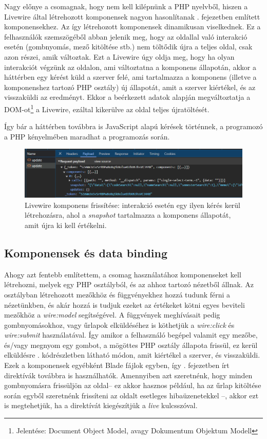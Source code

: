 \documentclass[
]{thesis-ekf}
\theoremstyle{definition}
\theoremstyle{remark}
\begin{document}
Nagy előnye a csomagnak, hogy nem kell kilépnünk a PHP nyelvből, hiszen a Livewire által létrehozott komponensek nagyon hasonlítanak . fejezetben említett komponensekhez. Az így létrehozott komponensek dinamikusan viselkednek. Ez a felhasználók szemszögéből abban jelenik meg, hogy az oldallal való interakció esetén (gombnyomás, mező kitöltése stb.) nem töltődik újra a teljes oldal, csak azon részei, amik változtak. Ezt a Livewire úgy oldja meg, hogy ha olyan interakciót végzünk az oldalon, ami változtatna a komponens állapotán, akkor a háttérben egy kérést küld a szerver felé, ami tartalmazza a komponens (illetve a komponenshez tartozó PHP osztály) új állapotát, amit a szerver kiértékel, és az visszaküldi az eredményt. Ekkor a beérkezett adatok alapján megváltoztatja a DOM-ot\footnote{Jelentése: Document Object Model, avagy Dokumentum Objektum Modell\cite{dom}} a Livewire, ezáltal kikerülve az oldal teljes újratöltését.

Így bár a háttérben továbbra is JavaScript alapú kérések történnek, a programozó a PHP kényelmében maradhat a programozás során.

\begin{figure}[ht!]
	\centering
	\includegraphics[width=15cm]{../pictures/screenshots/livewire_update.png}
	\caption{Livewire komponens frissítése: interakció esetén egy ilyen kérés kerül létrehozásra, ahol a \emph{snapshot} tartalmazza a komponens állapotát, amit újra ki kell értékelni.}
	\label{livewireUpdate}
\end{figure}

\subsection{Komponensek és data binding}

Ahogy azt fentebb említettem, a csomag használatához komponenseket kell létrehozni, melyek egy PHP osztályból, és az ahhoz tartozó nézetből állnak. Az osztályban létrehozott mezőkhöz és függvényekhez hozzá tudunk férni a nézetünkben, és akár hozzá is tudjuk ezeket az értékeket kötni egyes beviteli mezőkhöz a \emph{wire:model} segítségével. A függvények meghívásait pedig gombnyomásokhoz, vagy űrlapok elküldéséhez is köthetjük a \emph{wire:click} és \emph{wire:submit} használatával. Így amikor a felhasználó begépel valamit egy mezőbe, és/vagy megnyom egy gombot, a mögöttes PHP osztály állapota frissül, ez kerül elküldésre . kódrészletben látható módon, amit kiértékel a szerver, és visszaküldi. Ezek a komponensek egyébként Blade fájlok egyben, így . fejezetben írt direktívák továbbra is használhatók. Amennyiben azt szeretnénk, hogy minden  gombnyomásra frissüljön az oldal-- ez akkor hasznos például, ha az űrlap kitöltése során egyből szeretnénk frissíteni az oldalt esetleges hibaüzenetekkel --, akkor ezt is megtehetjük, ha a direktívát kiegészítjük a \emph{live} kulcsszóval.
\end{document}
